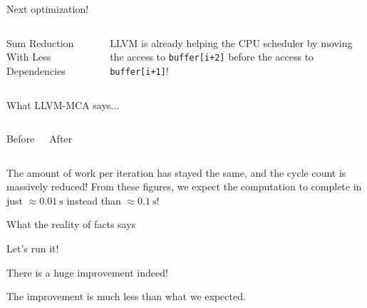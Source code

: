 \begin{frame}{Next optimization!}
\begin{columns}[onlytextwidth]

\begin{block}{Sum Reduction With Less Dependencies}
\end{block}

\centering
LLVM is already helping the CPU scheduler by moving the access to \texttt{buffer[i+2]} before the access to \texttt{buffer[i+1]}!

\end{columns}
\end{frame}


\begin{frame}{What LLVM-MCA says...}
\begin{columns}

\begin{block}{Before}
\end{block}

\begin{block}{After}
\end{block}

\end{columns}
\medskip
The amount of work per iteration has stayed the same, and the cycle count is massively reduced!
\smallskip
From these figures, we expect the computation to complete in just $\approx\SI{0.01}{\second}$
instead than $\approx\SI{0.1}{\second}$!
\end{frame}


\begin{frame}{What the reality of facts says}
\begin{block}{Let's run it!}
\end{block}
\medskip
\begin{description}[Good:]
\item[Good:] There is a huge improvement indeed!
\item[Bad:] The improvement is \alert{much less} than what we expected.
\end{description}
\end{frame}


